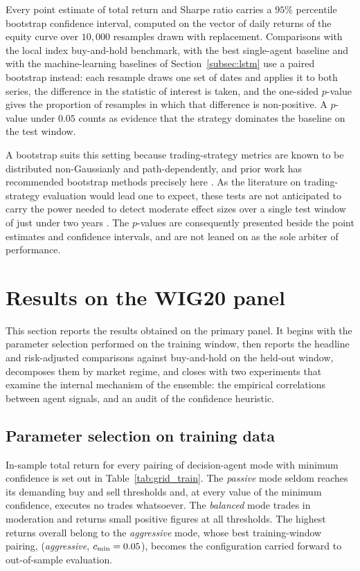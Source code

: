 Every point estimate of total return and Sharpe ratio carries a $95\%$ percentile bootstrap confidence interval, computed on the vector of daily returns of the equity curve over $10{,}000$ resamples drawn with replacement. Comparisons with the local index buy-and-hold benchmark, with the best single-agent baseline and with the machine-learning baselines of Section~\ref{subsec:lstm} use a paired bootstrap instead: each resample draws one set of dates and applies it to both series, the difference in the statistic of interest is taken, and the one-sided $p$-value gives the proportion of resamples in which that difference is non-positive. A $p$-value under $0.05$ counts as evidence that the strategy dominates the baseline on the test window.

A bootstrap suits this setting because trading-strategy metrics are known to be distributed non-Gaussianly and path-dependently, and prior work has recommended bootstrap methods precisely here \cite{politis1994}. As the literature on trading-strategy evaluation would lead one to expect, these tests are not anticipated to carry the power needed to detect moderate effect sizes over a single test window of just under two years \cite{bailey2014}. The $p$-values are consequently presented beside the point estimates and confidence intervals, and are not leaned on as the sole arbiter of performance.

\section{Results on the WIG20 panel}\label{sec:results}

This section reports the results obtained on the primary panel. It begins with the parameter selection performed on the training window, then reports the headline and risk-adjusted comparisons against buy-and-hold on the held-out window, decomposes them by market regime, and closes with two experiments that examine the internal mechanism of the ensemble: the empirical correlations between agent signals, and an audit of the confidence heuristic.

\subsection{Parameter selection on training data}\label{subsec:grid}

In-sample total return for every pairing of decision-agent mode with minimum confidence is set out in Table~\ref{tab:grid_train}. The \emph{passive} mode seldom reaches its demanding buy and sell thresholds and, at every value of the minimum confidence, executes no trades whatsoever. The \emph{balanced} mode trades in moderation and returns small positive figures at all thresholds. The highest returns overall belong to the \emph{aggressive} mode, whose best training-window pairing, (\emph{aggressive}, $c_{\min} = 0.05{}$), becomes the configuration carried forward to out-of-sample evaluation.

